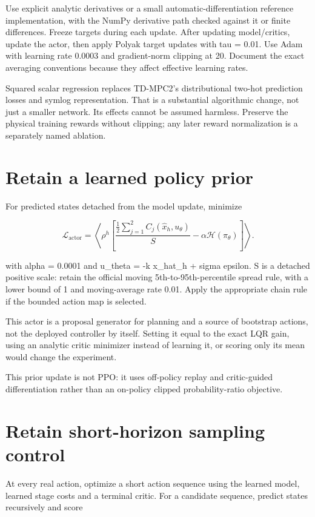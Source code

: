 \documentclass[11pt]{article}
\begin{document}
Use explicit analytic derivatives or a small automatic-differentiation reference implementation, with the NumPy derivative path checked against it or finite differences. Freeze targets during each update. After updating model/critics, update the actor, then apply Polyak target updates with tau = 0.01. Use Adam with learning rate 0.0003 and gradient-norm clipping at 20. Document the exact averaging conventions because they affect effective learning rates.

Squared scalar regression replaces TD-MPC2's distributional two-hot prediction losses and symlog representation. That is a substantial algorithmic change, not just a smaller network. Its effects cannot be assumed harmless. Preserve the physical training rewards without clipping; any later reward normalization is a separately named ablation.

\section{Retain a learned policy prior}

For predicted states detached from the model update, minimize

\[\mathcal L_{\mathrm{actor}}=\left\langle\rho^h\left[\frac{\frac12\sum_{j=1}^{2}C_j(\hat x_h,u_\theta)}{S}-\alpha\mathcal H(\pi_\theta)\right]\right\rangle.\]

with alpha = 0.0001 and u\_theta = -k x\_hat\_h + sigma epsilon. S is a detached positive scale: retain the official moving 5th-to-95th-percentile spread rule, with a lower bound of 1 and moving-average rate 0.01. Apply the appropriate chain rule if the bounded action map is selected.

This actor is a proposal generator for planning and a source of bootstrap actions, not the deployed controller by itself. Setting it equal to the exact LQR gain, using an analytic critic minimizer instead of learning it, or scoring only its mean would change the experiment.

This prior update is not PPO: it uses off-policy replay and critic-guided differentiation rather than an on-policy clipped probability-ratio objective.

\section{Retain short-horizon sampling control}

At every real action, optimize a short action sequence using the learned model, learned stage costs and a terminal critic. For a candidate sequence, predict states recursively and score
\end{document}
